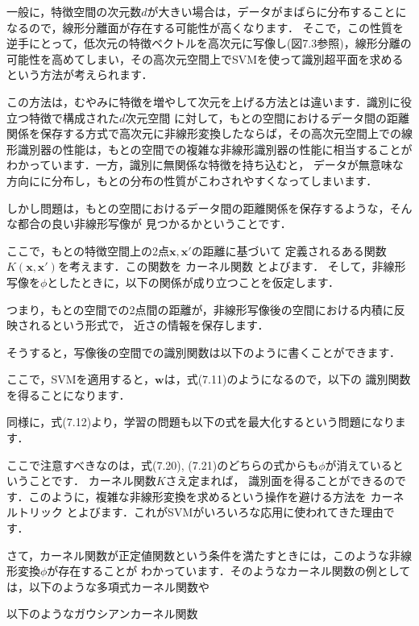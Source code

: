 
一般に，特徴空間の次元数$d$が大きい場合は，データがまばらに分布することになるので，線形分離面が存在する可能性が高くなります．
そこで，この性質を逆手にとって，低次元の特徴ベクトルを高次元に写像し(図7.3参照)，線形分離の可能性を高めてしまい，その高次元空間上でSVMを使って識別超平面を求めるという方法が考えられます．

この方法は，むやみに特徴を増やして次元を上げる方法とは違います．識別に役立つ特徴で構成された$d$次元空間
に対して，もとの空間におけるデータ間の距離関係を保存する方式で高次元に非線形変換したならば，その高次元空間上での線形識別器の性能は，もとの空間での複雑な非線形識別器の性能に相当することがわかっています．一方，識別に無関係な特徴を持ち込むと，
データが無意味な方向にに分布し，もとの分布の性質がこわされやすくなってしまいます．

しかし問題は，もとの空間におけるデータ間の距離関係を保存するような，そんな都合の良い非線形写像が
見つかるかということです．


ここで，もとの特徴空間上の2点$\bm{x}, \bm{x}'$の距離に基づいて
定義されるある関数$K(\bm{x}, \bm{x}')$を考えます．この関数を
カーネル関数
とよびます．
そして，非線形写像を$\phi$としたときに，以下の関係が成り立つことを仮定します．

つまり，もとの空間での2点間の距離が，非線形写像後の空間における内積に反映されるという形式で，
近さの情報を保存します．


そうすると，写像後の空間での識別関数は以下のように書くことができます．

ここで，SVMを適用すると，$\bm{w}$は，式(7.11)のようになるので，以下の
識別関数を得ることになります．

同様に，式(7.12)より，学習の問題も以下の式を最大化するという問題になります．

ここで注意すべきなのは，式(7.20), (7.21)のどちらの式からも$\phi$が消えているということです．
カーネル関数$K$さえ定まれば，
識別面を得ることができるのです．このように，複雑な非線形変換を求めるという操作を避ける方法を
カーネルトリック
とよびます．これがSVMがいろいろな応用に使われてきた理由です．


さて，カーネル関数が正定値関数という条件を満たすときには，このような非線形変換$\phi$が存在することが
わかっています．そのようなカーネル関数の例としては，以下のような多項式カーネル関数や

以下のようなガウシアンカーネル関数

